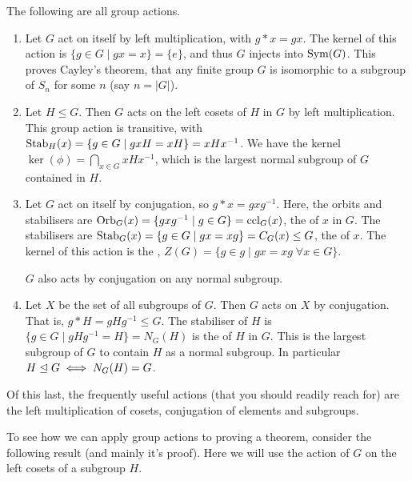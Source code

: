 \documentclass[a4paper]{scrartcl}
\begin{document}
\begin{example}
	The following are all group actions.
	\begin{enumerate}[label=(\roman*)]
		\item Let $G$ act on itself by left multiplication, with $g * x = gx$. The kernel of this action is $\{g \in G \mid gx = x \} = \{e\}$, and thus $G$ injects into $\operatorname{Sym}(G)$. This proves Cayley's theorem, that any finite group $G$ is isomorphic to a subgroup of $S_n$ for some $n$ (say $n = |G|$).
		\item Let $H \leq G$. Then $G$ acts on the left cosets of $H$ in $G$ by left multiplication. This group action is transitive, with $\operatorname{Stab}_H(x) = \{ g \in G \mid gxH = xH \} = xHx^{-1}$. We have the kernel $\ker(\phi) = \bigcap_{x \in G} xHx^{-1}$, which is the largest normal subgroup of $G$ contained in $H$.
		\item Let $G$ act on itself by conjugation, so $g * x = gxg^{-1}$. Here, the orbits and stabilisers are $\operatorname{Orb}_G(x) = \{ gxg^{-1} \mid g \in G \} = \operatorname{ccl}_G(x)$, the  of $x$ in $G$. The stabilisers are $\operatorname{Stab}_G(x) = \{ g \in G \mid gx = xg \} = C_G(x) \leq G$, the  of $x$. The kernel of this action is the , $Z(G) = \{ g \in g \mid gx = xg \; \forall x \in G \}$.
		
		$G$ also acts by conjugation on any normal subgroup.

		\item Let $X$ be the set of all subgroups of $G$. Then $G$ acts on $X$ by conjugation. That is, $g * H = g H g^{-1} \leq G$. The stabiliser of $H$ is $\{g \in G \mid gHg^{-1} = H \} = N_G(H)$ is the  of $H$ in $G$. This is the largest subgroup of $G$ to contain $H$ as a normal subgroup. In particular $H \trianglelefteq G \iff N_G(H) = G$. 
	\end{enumerate}
\end{example}

Of this last, the frequently useful actions (that you should readily reach for) are the left multiplication of cosets, conjugation of elements and subgroups.


To see how we can apply group actions to proving a theorem, consider the following result (and mainly it's proof). Here we will use the action of $G$ on the left cosets of a subgroup $H$.
\end{document}
